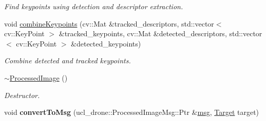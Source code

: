 \begin{DoxyCompactItemize}
\begin{DoxyCompactList}\small\item\em Find keypoints using detection and descriptor extraction. \end{DoxyCompactList}\item 
void \hyperlink{classProcessedImage_ac8955f0c80a6dc3dde51167083e22634}{combine\+Keypoints} (cv\+::\+Mat \&tracked\+\_\+descriptors, std\+::vector$<$ cv\+::\+Key\+Point $>$ \&tracked\+\_\+keypoints, cv\+::\+Mat \&detected\+\_\+descriptors, std\+::vector$<$ cv\+::\+Key\+Point $>$ \&detected\+\_\+keypoints)
\begin{DoxyCompactList}\small\item\em Combine detected and tracked keypoints. \end{DoxyCompactList}\item 
\hyperlink{classProcessedImage_ad54aba79f66018dffdfe6c3671e60f9c}{$\sim$\+Processed\+Image} ()
\begin{DoxyCompactList}\small\item\em Destructor. \end{DoxyCompactList}\item 
\mbox{\label{classProcessedImage_a05b1fa58ff21619a11364f7d7474b602}} 
void {\bfseries convert\+To\+Msg} (ucl\+\_\+drone\+::\+Processed\+Image\+Msg\+::\+Ptr \&\hyperlink{classProcessedImage_a8e3f0066b0fd5f1b858f0d977d8cb8ff}{msg}, \hyperlink{classTarget}{Target} target)
\end{DoxyCompactItemize}
